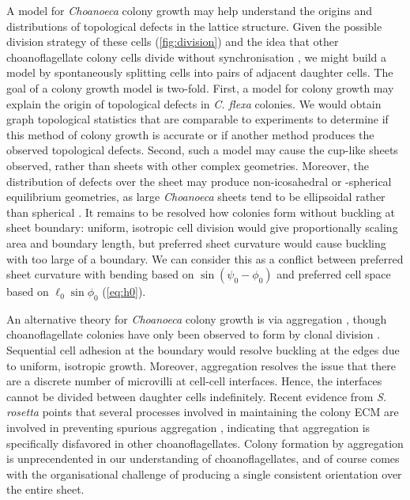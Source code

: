 A model for \textit{Choanoeca} colony growth may help understand the origins and distributions of topological defects in the lattice structure. 
Given the possible division strategy of these cells (\cref{fig:division}) and the idea that other choanoflagellate colony cells divide without synchronisation \citep{larson2020}, we might build a model by spontaneously splitting cells into pairs of adjacent daughter cells.
The goal of a colony growth model is two-fold.
First, a model for colony growth may explain the origin of topological defects in \textit{C. flexa} colonies.
We would obtain graph topological statistics that are comparable to experiments to determine if this method of colony growth is accurate or if another method produces the observed topological defects.
Second, such a model may cause the cup-like sheets observed, rather than sheets with other complex geometries.
Moreover, the distribution of defects over the sheet may produce non-icosahedral or -spherical equilibrium geometries, as large \textit{Choanoeca} sheets tend to be ellipsoidal rather than spherical \citep{leadbeater1983,brunet2019}.
It remains to be resolved how colonies form without buckling at sheet boundary: uniform, isotropic cell division would give proportionally scaling area and boundary length, but preferred sheet curvature would cause buckling with too large of a boundary.
We can consider this as a conflict between preferred sheet curvature with bending based on $\sin (\psi_0 - \phi_0)$ and preferred cell space based on $\ell_0 \sin \phi_0$ (\cref{eq:h0}).

An alternative theory for \textit{Choanoeca} colony growth is via aggregation \citep{grosberg2007}, though choanoflagellate colonies have only been observed to form by clonal division \citep{fairclough2010,alegado2012,woznica2016}.
Sequential cell adhesion at the boundary would resolve buckling at the edges due to uniform, isotropic growth.
Moreover, aggregation resolves the issue that there are a discrete number of microvilli at cell-cell interfaces.
Hence, the interfaces cannot be divided between daughter cells indefinitely.
Recent evidence from \textit{S. rosetta} points that several processes involved in maintaining the colony ECM are involved in preventing spurious aggregation \citep{wetzel2018}, indicating that aggregation is specifically disfavored in other choanoflagellates.
Colony formation by aggregation is unprecendented in our understanding of choanoflagellates, and of course comes with the organisational challenge of producing a single consistent orientation over the entire sheet.

